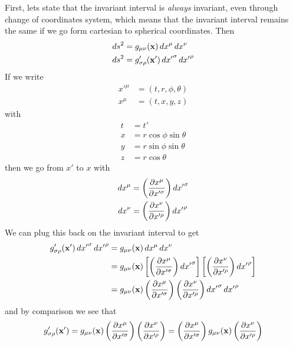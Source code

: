 \documentclass[oneside, 10pt, notitlepage]{book}
\begin{document}
First, lets state that the invariant interval is \emph{always} invariant, even through change of coordinates system, which means that the invariant interval remains the same if we go form cartesian to spherical coordinates. Then
\begin{equation}
\begin{split}
    \dd{s}^2 &= g_{\mu\nu}(\vb{x})\dd{x}^{\mu}\dd{x}^{\nu} \\
    \dd{s}^2 &= g'_{\sigma\rho}(\vb{x'})\dd{x'}^{\sigma}\dd{x'}^{\rho}
\end{split}
\end{equation}
If we write
\begin{equation}
\begin{split}
x'^{\mu} &= (t,r,\phi,\theta) \\
x^{\mu} &= (t,x,y,z)
\end{split}
\end{equation}
with
\begin{equation}
\begin{split}
    t &= t'\\
    x &= r\cos \phi \sin \theta \\
    y &= r\sin \phi \sin \theta \\
    z &= r \cos \theta
\end{split}
\end{equation}
then we go from \(x'\) to \(x\) with
\begin{equation}
\begin{split}
    \dd{x}^{\mu} &= \left(\pdv{x^{\mu}}{x'^{\sigma}}\right) \dd{x'}^{\sigma}\\
    \dd{x}^{\nu} &= \left(\pdv{x^{\nu}}{x'^{\rho}}\right) \dd{x'}^{\rho}
\end{split}
\end{equation}
We can plug this back on the invariant interval to get
\begin{equation}
\begin{split}
g'_{\sigma\rho}(\vb{x'})\dd{x'}^{\sigma}\dd{x'}^{\rho} &= g_{\mu\nu}(\vb{x})\dd{x}^{\mu}\dd{x}^{\nu}\\
&=  g_{\mu\nu}(\vb{x}) \left[\left(\pdv{x^{\mu}}{x'^{\sigma}}\right) \dd{x'}^{\sigma}\right]\left[\left(\pdv{x^{\nu}}{x'^{\rho}}\right) \dd{x'}^{\rho}\right] \\
&= g_{\mu\nu}(\vb{x})\left(\pdv{x^{\mu}}{x'^{\sigma}}\right)\left(\pdv{x^{\nu}}{x'^{\rho}}\right)\dd{x'}^{\sigma}\dd{x'}^{\rho}
\end{split}
\end{equation}
and by comparison we see that
\begin{equation}
    g'_{\sigma\rho}(\vb{x'})=g_{\mu\nu}(\vb{x})\left(\pdv{x^{\mu}}{x'^{\sigma}}\right)\left(\pdv{x^{\nu}}{x'^{\rho}}\right) = \left(\pdv{x^{\mu}}{x'^{\sigma}}\right)g_{\mu\nu}(\vb{x})\left(\pdv{x^{\nu}}{x'^{\rho}}\right)
\end{equation}
\end{document}
